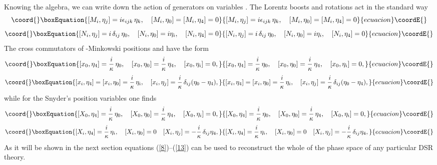 \documentclass  [12pt] {article}
\begin{document}
 Knowing the algebra, we can write down the action of \coordHE{}
generators on variables \coordHE{}. The Lorentz boosts and rotations act in the
standard way
\begin{equation}\coord{}\boxEquation{\label{8}
 [M_i, \eta_j] = i\epsilon_{ijk}\, \eta_k, \quad [M_i, \eta_0]=[M_i, \eta_4] =0
}{[M_i, \eta_j] = i\epsilon_{ijk}\, \eta_k, \quad [M_i, \eta_0]=[M_i, \eta_4] =0
}{ecuacion}\coordE{}\end{equation}
\begin{equation}\coord{}\boxEquation{\label{9}
 [N_i,\eta_j] = i\, \delta_{ij}\, \eta_0, \quad [N_i, \eta_0] = i \eta_i,\quad [N_i, \eta_4] =0
}{[N_i,\eta_j] = i\, \delta_{ij}\, \eta_0, \quad [N_i, \eta_0] = i \eta_i,\quad [N_i, \eta_4] =0
}{ecuacion}\coordE{}\end{equation}
The cross commutators of \myHighlight{$\kappa$}\coordHE{}-Minkowski positions and \coordHE{} have the
form
\begin{equation}\coord{}\boxEquation{\label{10}
  [x_0,\eta_4] = \frac{i}\kappa\, \eta_0, \quad [x_0,\eta_0] = \frac{i}\kappa\, \eta_4, \quad [x_0,\eta_i] = 0,
}{[x_0,\eta_4] = \frac{i}\kappa\, \eta_0, \quad [x_0,\eta_0] = \frac{i}\kappa\, \eta_4, \quad [x_0,\eta_i] = 0,
}{ecuacion}\coordE{}\end{equation}
\begin{equation}\coord{}\boxEquation{\label{11}
  [x_i, \eta_4] = [x_i, \eta_0] =\frac{i}\kappa\, \eta_i, \quad [x_i, \eta_j] = \frac{i}\kappa\,
\delta_{ij}(\eta_0 - \eta_4),
}{[x_i, \eta_4] = [x_i, \eta_0] =\frac{i}\kappa\, \eta_i, \quad [x_i, \eta_j] = \frac{i}\kappa\,
\delta_{ij}(\eta_0 - \eta_4),
}{ecuacion}\coordE{}\end{equation}
while for the Snyder's position variables one finds
\begin{equation}\coord{}\boxEquation{\label{12}
  [X_0,\eta_4] = \frac{i}\kappa\, \eta_0, \quad [X_0,\eta_0] = \frac{i}\kappa\, \eta_4, \quad [X_0,\eta_i] = 0,
}{[X_0,\eta_4] = \frac{i}\kappa\, \eta_0, \quad [X_0,\eta_0] = \frac{i}\kappa\, \eta_4, \quad [X_0,\eta_i] = 0,
}{ecuacion}\coordE{}\end{equation}
\begin{equation}\coord{}\boxEquation{\label{13}
  [X_i, \eta_4] = \frac{i}\kappa\, \eta_i,\quad  [X_i, \eta_0] =0
  \quad [X_i, \eta_j] = -\frac{i}\kappa\,
\delta_{ij}  \eta_4,
}{[X_i, \eta_4] = \frac{i}\kappa\, \eta_i,\quad  [X_i, \eta_0] =0
  \quad [X_i, \eta_j] = -\frac{i}\kappa\,
\delta_{ij}  \eta_4,
}{ecuacion}\coordE{}\end{equation}
As it will be shown in the next section equations (\ref{8})--(\ref{13}) can be
used  to reconstruct the whole of the phase space of any particular DSR theory.
\end{document}
